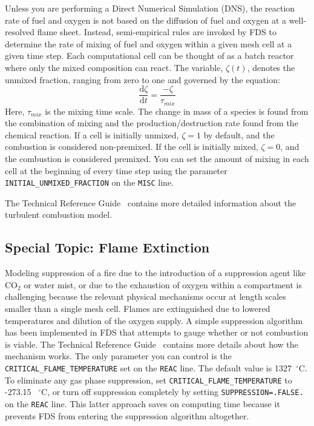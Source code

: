 \documentclass[11pt]{book}
\newcommand{\ct}{\tt\small}
\begin{document}
\label{info:turbulent_combustion}

Unless you are performing a Direct Numerical Simulation (DNS), the reaction rate of fuel and oxygen is not based on the diffusion of
fuel and oxygen at a well-resolved flame sheet. Instead, semi-empirical rules are invoked by FDS to determine the rate of mixing of fuel and oxygen within
a given mesh cell at a given time step. Each computational cell can be thought of as a batch reactor where only the mixed composition can react. The variable, $\zeta(t)$, denotes the unmixed fraction, ranging from zero to one and governed by the equation:
\begin{equation}
\frac{\mbox{d}\zeta}{\mbox{d}t}=\frac{-\zeta}{\tau_{mix}}
\label{eq:edc_mix}
\end{equation}
Here, $\tau_{mix}$ is the mixing time scale. The change in mass of a species is found from the combination of mixing and the production/destruction rate found from the chemical reaction. If a cell is initially unmixed, $\zeta=1$ by default, and the combustion is considered non-premixed. If the cell is initially mixed, $\zeta=0$, and the combustion is considered premixed. You can set the amount of mixing in each cell at the beginning of every time step using the parameter {\ct INITIAL\_UNMIXED\_FRACTION} on the {\ct MISC} line.

The Technical Reference Guide~\cite{FDS_Math_Guide} contains more detailed information about the turbulent combustion model.

\subsection{Special Topic: Flame Extinction}

\label{info:extinction}

Modeling suppression of a fire due to the introduction of a suppression
agent like CO$_2$ or water mist, or due to the exhaustion of oxygen
within a compartment is challenging because
the relevant physical mechanisms occur at length scales smaller than a
single mesh cell. Flames are extinguished due to lowered
temperatures and dilution of the oxygen supply. A simple
suppression algorithm has been implemented in FDS that attempts to
gauge whether or not combustion is viable. The Technical Reference Guide~\cite{FDS_Math_Guide}
contains more details about how the mechanism works. The only
parameter you can control is the {\ct CRITICAL\_FLAME\_TEMPERATURE} set on the {\ct REAC} line.
The default value is 1327~$^\circ$C.
To eliminate any gas phase suppression, set  {\ct CRITICAL\_FLAME\_TEMPERATURE} to -273.15 ~$^\circ$C, or turn off suppression completely
by setting {\ct SUPPRESSION=.FALSE.} on the {\ct REAC} line. This latter approach saves on computing time because it
prevents FDS from entering the suppression algorithm altogether.
\end{document}

